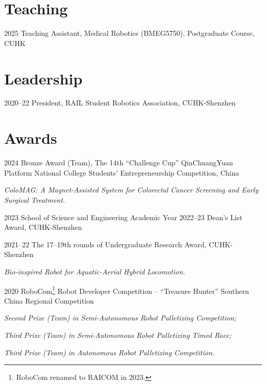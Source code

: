 \documentclass[11pt,letterpaper]{report}
\begin{document}
\section*{Teaching}
\begin{tablist}
\item[2025] \tab Teaching Assistant, Medical Robotics (BMEG5750), Postgraduate Course, CUHK
\end{tablist}
	
\section*{Leadership}
\begin{tablist}
	\item[2020--22]   \tab President, RAIL Student Robotics Association, CUHK-Shenzhen 
\end{tablist}
	
\section*{Awards}
\begin{tablist}	
%	
%	
	
	\item[2024] \tab Bronze Award (Team), The 14th ``Challenge Cup'' QinChuangYuan Platform National College Students' Entrepreneurship Competition, China

	\textit{ColoMAG: A Magnet-Assisted System for Colorectal Cancer Screening and Early Surgical Treatment.}	

	\item[2023]   \tab School of Science and Engineering Academic Year 2022--23 Dean's List Award, CUHK-Shenzhen
	\item[2021--22]   \tab The 17--19th rounds of  Undergraduate Research Award, CUHK-Shenzhen
	
	\textit{Bio-inspired Robot for Aquatic-Aerial Hybrid Locomotion.}
	
	\item[2020] \tab RoboCom\footnote{RoboCom renamed to RAICOM in 2023.} Robot Developer Competition -- ``Treasure Hunter'' Southern China Regional Competition
	
	\textit{Second Prize (Team) in Semi-Autonomous Robot Palletizing Competition;}
	
	\textit{Third Prize (Team) in Semi-Autonomous Robot Palletizing Timed Race;}
	
	\textit{Third Prize (Team) in Autonomous Robot Palletizing Competition.}
\end{tablist}
	
\end{document}
